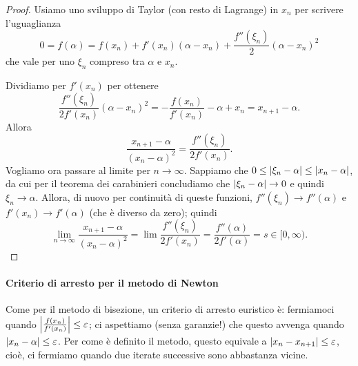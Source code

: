 \documentclass[a4paper]{report}
\DeclarePairedDelimiter{\abs}{\lvert}{\rvert}
\theoremstyle{definiton}
\theoremstyle{remark}
\begin{document}
\begin{proof}
Usiamo uno sviluppo di Taylor (con resto di Lagrange) in $x_n$ per scrivere l'uguaglianza
\[
0 = f(\alpha) = f(x_n) + f'(x_n)(\alpha-x_n) + \frac{f''(\xi_n)}{2}(\alpha-x_n)^2
\]
che vale per uno $\xi_n$ compreso tra $\alpha$ e $x_n$.

Dividiamo per $f'(x_n)$ per ottenere
\[
\frac{f''(\xi_n)}{2f'(x_n)}(\alpha-x_n)^2 = - \frac{f(x_n)}{f'(x_n)} - \alpha + x_n   =  x_{n+1} - \alpha.
\]
Allora
\[
\frac{x_{n+1} - \alpha}{(x_n-\alpha)^2} = \frac{f''(\xi_n)}{2f'(x_n)}.
\]
Vogliamo ora passare al limite per $n \to \infty$. Sappiamo che $0 \leq \abs{\xi_n - \alpha} \leq \abs{x_n - \alpha}$, da cui per il teorema dei carabinieri concludiamo che $\abs{\xi_n - \alpha} \to 0$ e quindi $\xi_n \to \alpha$. Allora, di nuovo per continuità di queste funzioni, $f''(\xi_n) \to f''(\alpha)$ e $f'(x_n) \to f'(\alpha)$ (che è diverso da zero); quindi
\[
\lim_{n\to\infty} \frac{x_{n+1} - \alpha}{(x_n-\alpha)^2} = \lim \frac{f''(\xi_n)}{2f'(x_n)} = \frac{f''(\alpha)}{2f'(\alpha)} = s \in [0,\infty).
\]
\end{proof}

\paragraph{Criterio di arresto per il metodo di Newton} Come per il metodo di bisezione, un criterio di arresto euristico è: fermiamoci quando $\abs*{\frac{f(x_n)}{f'(x_n)}} \leq \varepsilon$; ci aspettiamo (senza garanzie!) che questo avvenga quando $\abs{x_n - \alpha} \leq \varepsilon$. Per come è definito il metodo, questo equivale a $\abs{x_n - x_{n+1}} \leq \varepsilon$, cioè, ci fermiamo quando due iterate successive sono abbastanza vicine.
\end{document}
